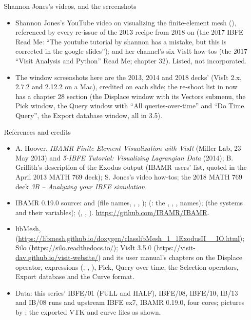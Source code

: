 \documentclass[aspectratio=169,11pt]{beamer}
\begin{document}
\begin{frame}{Shannon Jones's videos, and the screenshots}
\label{fr:screenshots}
\small
\begin{itemize}
  \item Shannon Jones's YouTube video on visualizing the finite-element mesh (), referenced by every re-issue of the 2013 recipe from 2018 on (the 2017 IBFE Read Me: ``The youtube tutorial by shannon has a mistake, but this is corrected in the google slides''); and her channel's six VisIt how-tos (the 2017 ``Visit Analysis and Python'' Read Me; chapter 32). Listed, not incorporated.
  \item The window screenshots here are the 2013, 2014 and 2018 decks' (VisIt 2.x, 2.7.2 and 2.12.2 on a Mac), credited on each slide; the re-shoot list in  now has a chapter 28 section (the Displace window with its Vectors submenu, the Pick window, the Query window with ``All queries-over-time'' and ``Do Time Query'', the Export database window, all in 3.5).
\end{itemize}
\end{frame}

\begin{frame}{References and credits}
\label{fr:refs}
\scriptsize
\begin{itemize}
  \item A. Hoover, \emph{IBAMR Finite Element Visualization with VisIt} (Miller Lab, 23 May 2013) and \emph{5-IBFE Tutorial: Visualizing Lagrangian Data} (2014); B. Griffith's description of the Exodus output (IBAMR users' list, quoted in the April 2013 MATH 769 deck); S. Jones's video how-tos; the 2018 MATH 769 deck \emph{3B -- Analyzing your IBFE simulation}.
  \item IBAMR 0.19.0 source:  and  (file names, , , );  (: the , , ,  names);  (the systems and their variables);  (, , ). \url{https://github.com/IBAMR/IBAMR}.
  \item libMesh,  (\url{https://libmesh.github.io/doxygen/classlibMesh_1_1ExodusII__IO.html}); Silo (\url{https://silo.readthedocs.io/}); VisIt 3.5.0 (\url{https://visit-dav.github.io/visit-website/}) and its user manual's chapters on the Displace operator, expressions (, , ), Pick, Query over time, the Selection operators, Export database and the Curve format.
  \item Data: this series' IBFE/01 (FULL and HALF), IBFE/08, IBFE/10, IB/13 and IB/08 runs and upstream IBFE ex7, IBAMR 0.19.0, four cores; pictures by ; the exported VTK and curve files as shown.
\end{itemize}
\end{frame}
\end{document}
